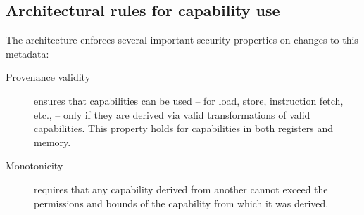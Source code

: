 \documentclass[11pt]{article}
\newcommand{\note}[2]{{\color{blue}[ Note: #1 - #2]}}
\renewcommand{\note}[2]{}
\newcommand{\rwnote}[1]{\note{#1}{Robert W.}}
\newcommand{\psnote}[1]{\note{#1}{Peter S.}}
\newcommand{\pgnnote}[1]{\note{#1}{Peter N.}}
\begin{document}
\subsection{Architectural rules for capability use}

The architecture enforces several important security properties on changes to
this metadata:

\begin{description}
\item[Provenance validity] ensures that capabilities can be used -- for
  load, store, instruction fetch, etc., -- only if they are derived via valid
  transformations of valid capabilities.
  This property holds for capabilities in both registers and memory.



  
\item[Monotonicity] requires that any capability derived from another
  cannot exceed the permissions and bounds of the capability from which it was derived.

  
\end{description}
\end{document}
